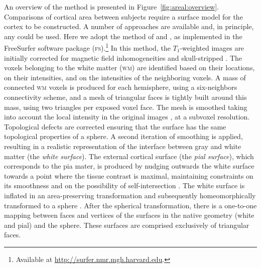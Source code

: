 An overview of the method is presented in Figure~\ref{fig:areal:overview}. Comparisons of cortical area between subjects require a surface model for the cortex to be constructed. A number of approaches are available \citep{Mangin1995, Dale1999, vanEssen2001, Kim2005} and, in principle, any could be used. Here we adopt the method of \citet{Dale1999} and \citet{Fischl1999_cortical}, as implemented in the FreeSurfer software package (\textsc{fs}).\footnote{Available at \href{http://surfer.nmr.mgh.harvard.edu}{http://surfer.nmr.mgh.harvard.edu}.} In this method, the $T_1$-weighted images are initially corrected for magnetic field inhomogeneities and skull-stripped \citep{Segonne2004}. The voxels belonging to the white matter (\textsc{wm}) are identified based on their locations, on their intensities, and on the intensities of the neighboring voxels. A mass of connected \textsc{wm} voxels is produced for each hemisphere, using a six-neighbors connectivity scheme, and a mesh of triangular faces is tightly built around this mass, using two triangles per exposed voxel face. The mesh is smoothed taking into account the local intensity in the original images \citep{Dale1993}, at a subvoxel resolution. Topological defects are corrected \citep{Fischl2001,Segonne2007} ensuring that the surface has the same topological properties of a sphere. A second iteration of smoothing is applied, resulting in a realistic representation of the interface between gray and white matter (the \emph{white surface}). The external cortical surface (the \emph{pial surface}), which corresponds to the pia mater, is produced by nudging outwards the white surface towards a point where the tissue contrast is maximal, maintaining constraints on its smoothness and on the possibility of self-intersection \citep{Fischl2000}. The white surface is inflated in an area-preserving transformation and subsequently homeomorphically transformed to a sphere \citep{Fischl1999_intersubject}. After the spherical transformation, there is a one-to-one mapping between faces and vertices of the surfaces in the native geometry (white and pial) and the sphere. These surfaces are comprised exclusively of triangular faces.


